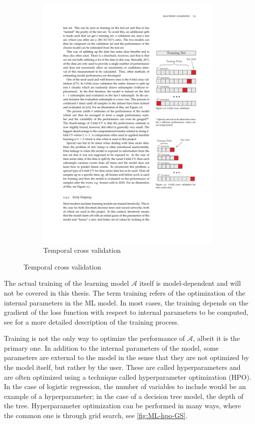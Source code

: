 \begin{figure}[htbp]
\begin{subfigure}{.5\textwidth}
        \includegraphics[trim={14.14cm 7.67cm 2.1cm 16.5cm}, clip, width=.8\linewidth]{figures/MasterThesis-cross-validation}
        \caption{Temporal cross validation}
        \label{fig:ML-crossval-temporal}
    \end{subfigure}
\end{figure}

The actual training of the learning model $\mathcal{A}$ itself is model-dependent and will not be covered in this thesis. The term training refers of the optimization of the internal parameters in the ML model. In most cases, the training depends on the gradient of the loss function with respect to internal parameters to be computed, see \cite{michelsenPhysicistApproachMachine2020} for a more detailed description of the training process.

Training is not the only way to optimize the performance of  $\mathcal{A}$, albeit it is the primary one. In addition to the internal parameters of the model, some parameters are external to the model in the sense that they are not optimized by the model itself, but rather by the user. These are called hyperparameters and are often optimized using a technique called hyperparameter optimization (HPO). In the case of logistic regression, the number of variables to include would be an example of a hyperparameter; in the case of a decision tree model, the depth of the tree. Hyperparameter optimization can be performed in many ways, where the common one is through grid search, see \autoref{fig:ML-hpo-GS}.

